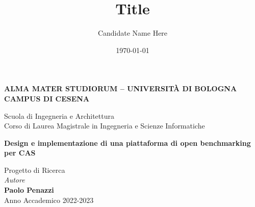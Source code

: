 \title{Title}
\author{Candidate Name Here}
\date{\today}

\begin{titlepage}
	\begin{center}
		
		\large
		\textbf{ALMA MATER STUDIORUM -- UNIVERSITÀ DI BOLOGNA \\ CAMPUS DI CESENA}
		\\
		\noindent\hrulefill
		\vspace{0.4cm}
		
		\Large
		Scuola di Ingegneria e Architettura \\
		Corso di Laurea Magistrale in Ingegneria e Scienze Informatiche
		
		\Huge
		\vspace{4cm}
		\textbf{
			Design e implementazione di una piattaforma di open benchmarking per CAS
			\\
		}
		
		\large
		\vspace{1cm}
		Progetto di Ricerca 
		\\
		
		\vspace{5.5cm}
		\textit{Autore} 
				\\ 
				\textbf{Paolo Penazzi}
		\vfill
		\noindent\hrulefill
		\vspace{0.3cm}
		\Large
		\\
		Anno Accademico 2022-2023
	\end{center}
\end{titlepage}
\restoregeometry